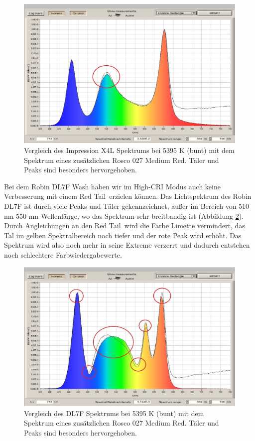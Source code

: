 \begin{figure}[H]     %
\centering
\includegraphics[width=1.0\textwidth]{bilder/glp1} 
\caption {Vergleich des Impression X4L Spektrums bei 5395 K (bunt) mit dem Spektrum eines zusätzlichen Rosco 027 \glqq Medium Red\grqq . Täler und Peaks sind besonders hervorgehoben.}\label{b_impression1}
\end{figure}

Bei dem Robin DL7F Wash haben wir im High-CRI Modus auch keine Verbesserung mit einem \glqq Red Tail\grqq\ erzielen können. Das Lichtspektrum des Robin DL7F ist durch viele Peaks und Täler gekennzeichnet, außer im Bereich von 510 nm-550 nm Wellenlänge, wo das Spektrum sehr breitbandig ist (Abbildung \ref{b_dl7f1}). Durch Angleichungen an den \glqq Red Tail\grqq\ wird die Farbe Limette vermindert, das Tal im gelben Spektralbereich noch tiefer und der rote Peak wird erhöht. Das Spektrum wird also noch mehr in seine Extreme verzerrt und dadurch entstehen noch schlechtere Farbwiedergabewerte.

\begin{figure}[H]     %
\centering
\includegraphics[width=1.0\textwidth]{bilder/dl7f1} 
\caption {Vergleich des DL7F Spektrums bei 5395 K (bunt) mit dem Spektrum eines zusätzlichen Rosco 027 \glqq Medium Red\grqq . Täler und Peaks sind besonders hervorgehoben.}\label{b_dl7f1}
\end{figure}


